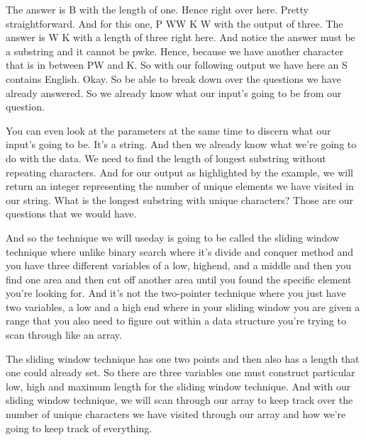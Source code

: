 \expandafter\def\csname sourceexcerpt@30\endcsname{%
The answer is B with the length of one. Hence right over here. Pretty straightforward.
And for this one, P WW K W with the output of three. The answer is W K with a length
of three right here. And notice the answer must be a substring and it cannot be pwke.
Hence, because we have another character that is in between PW and K. So with our
following output we have here an S contains English. Okay. So be able to break down
over the questions we have already answered. So we already know what our input's going
to be from our question.

You can even look at the parameters at the same time to discern what our input's going
to be. It's a string. And then we already know what we're going to do with the data.
We need to find the length of longest substring without repeating characters. And for
our output as highlighted by the example, we will return an integer representing the
number of unique elements we have visited in our string. What is the longest substring
with unique characters? Those are our questions that we would have.

And so the technique we will useday is going to be called the
sliding window technique where unlike binary search where it's divide and conquer
method and you have three different variables of a low, highend, and a middle and then
you find one area and then cut off another area until you found the specific element
you're looking for. And it's not the two-pointer technique where you just have two
variables, a low and a high end where in your sliding window you are given a range
that you also need to figure out within a data structure you're trying to scan through
like an array.

The sliding window technique has one two points and then also has a length that one
could already set. So there are three variables one must construct particular low,
high and maximum length for the sliding window technique. And with our sliding window
technique, we will scan through our array to keep track over the number of unique
characters we have visited through our array and how we're going to keep track of
everything.
}


